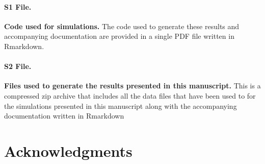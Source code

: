 \documentclass[10pt,letterpaper]{article}
\begin{document}
\paragraph*{S1 File.}
\label{S1_Rmarkdow}
{\bf Code used for simulations.} The code used to generate these results and accompanying documentation are provided in a single PDF file written in Rmarkdown.

\paragraph*{S2 File.}
\label{S2_Data}
{\bf Files used to generate the results presented in this manuscript.} This is a compressed zip archive that includes all the data files that have been used to for the simulations presented in this manuscript along with the accompanying documentation written in Rmarkdown 

\section*{Acknowledgments}

\nolinenumbers


%
%
% 
%
\end{document}
